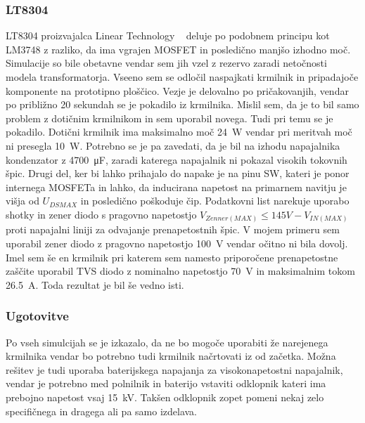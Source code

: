 \documentclass[a4paper,twoside,openright,12pt,slovene]{book}
\begin{document}
	\subsubsection{LT8304} \label{LT8304}
LT8304 proizvajalca Linear Technology ~\cite{analog:LT8304} deluje po podobnem principu kot LM3748 z razliko, da ima vgrajen MOSFET in posledično manjšo izhodno moč. Simulacije so bile obetavne vendar sem jih vzel z rezervo zaradi netočnosti modela transformatorja. Vseeno sem se odločil naspajkati krmilnik in pripadajoče komponente na prototipno ploščico. Vezje je delovalno po pričakovanjih, vendar po približno 20 sekundah se je pokadilo iz krmilnika. Mislil sem, da je to bil samo problem z dotičnim krmilnikom in sem uporabil novega. Tudi pri temu se je pokadilo. Dotični krmilnik ima maksimalno moč \SI{24}{\watt} vendar pri meritvah moč ni presegla \SI{10}{\watt}. Potrebno se je pa zavedati, da je bil na izhodu napajalnika kondenzator z \SI{4700}{\micro\farad}, zaradi katerega napajalnik ni pokazal visokih tokovnih špic. Drugi del, ker bi lahko prihajalo do napake je na pinu SW, kateri je ponor internega MOSFETa in lahko, da inducirana napetost na primarnem navitju je višja od \(U_{DS MAX}\) in posledično poškoduje čip. Podatkovni list narekuje uporabo shotky in zener diodo s pragovno napetostjo \(V_{Zenner(MAX)} \leq 145V - V_{IN(MAX)}\) proti napajalni liniji za odvajanje prenapetostnih špic. V mojem primeru sem uporabil zener diodo z pragovno napetostjo \SI{100}{\volt} vendar očitno ni bila dovolj. Imel sem še en krmilnik pri katerem sem namesto priporočene prenapetostne zaščite uporabil TVS diodo z nominalno napetostjo \SI{70}{\volt} in maksimalnim tokom \SI{26.5}{\ampere}. Toda rezultat je bil še vedno isti.

    \subsubsection{Ugotovitve} \label{Ugotovitve glede komercialnih krmilnkov}
Po vseh simulcijah se je izkazalo, da ne bo mogoče uporabiti že narejenega krmilnika vendar bo potrebno tudi krmilnik načrtovati iz od začetka. Možna rešitev je tudi uporaba baterijskega napajanja za visokonapetostni napajalnik, vendar je potrebno med polnilnik in baterijo vstaviti odklopnik kateri ima prebojno napetost vsaj \SI{15}{\kilo\volt}. Takšen odklopnik zopet pomeni nekaj zelo specifičnega in dragega ali pa samo izdelava. 
\end{document}
